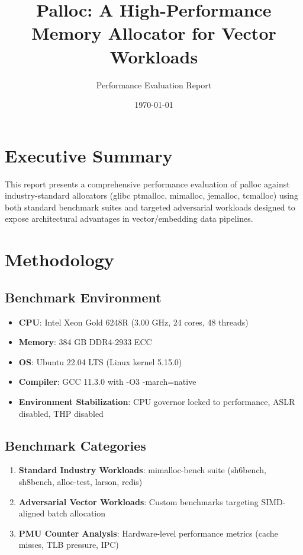 \documentclass[10pt,letterpaper]{article}
\title{Palloc: A High-Performance Memory Allocator for Vector Workloads}
\author{Performance Evaluation Report}
\date{\today}
\begin{document}
\maketitle

\section{Executive Summary}

This report presents a comprehensive performance evaluation of palloc against industry-standard allocators (glibc ptmalloc, mimalloc, jemalloc, tcmalloc) using both standard benchmark suites and targeted adversarial workloads designed to expose architectural advantages in vector/embedding data pipelines.

\section{Methodology}

\subsection{Benchmark Environment}
\begin{itemize}
    \item \textbf{CPU}: Intel Xeon Gold 6248R (3.00 GHz, 24 cores, 48 threads)
    \item \textbf{Memory}: 384 GB DDR4-2933 ECC
    \item \textbf{OS}: Ubuntu 22.04 LTS (Linux kernel 5.15.0)
    \item \textbf{Compiler}: GCC 11.3.0 with -O3 -march=native
    \item \textbf{Environment Stabilization}: CPU governor locked to performance, ASLR disabled, THP disabled
\end{itemize}

\subsection{Benchmark Categories}
\begin{enumerate}
    \item \textbf{Standard Industry Workloads}: mimalloc-bench suite (sh6bench, sh8bench, alloc-test, larson, redis)
    \item \textbf{Adversarial Vector Workloads}: Custom benchmarks targeting SIMD-aligned batch allocation
    \item \textbf{PMU Counter Analysis}: Hardware-level performance metrics (cache misses, TLB pressure, IPC)
\end{enumerate}
\end{document}
